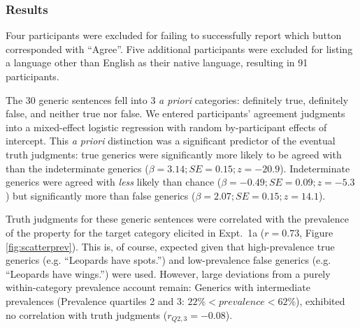 \documentclass[10pt,letterpaper]{article}
\begin{document}
\subsubsection{Results}

Four participants were excluded for failing to successfully report which button corresponded with ``Agree''. 
Five additional participants were excluded for listing a language other than English as their native language, resulting in 91 participants.


The 30 generic sentences fell into 3 \emph{a priori} categories: definitely true, definitely false, and neither true nor false. 
We entered participants' agreement judgments into a mixed-effect logistic regression with random by-participant effects of intercept. 
This \emph{a priori} distinction was a significant predictor of the eventual truth judgments: true generics were significantly more likely to be agreed with than the indeterminate generics ($\beta = 3.14; SE = 0.15; z = -20.9$).
Indeterminate generics were agreed with \emph{less} likely than chance ($\beta = -0.49; SE = 0.09; z = -5.3$) but significantly more than false generics ($\beta = 2.07; SE = 0.15; z = 14.1$).

Truth judgments for these generic sentences were correlated with the prevalence of the property for the target category elicited in Expt.~1a ($r = 0.73$, Figure \ref{fig:scatterprev}). This is, of course, expected given that high-prevalence true generics (e.g. ``Leopards have spots.'') and low-prevalence false generics (e.g. ``Leopards have wings.'') were used. 
However, large deviations from a purely within-category prevalence account remain: Generics with intermediate prevalences (Prevalence quartiles 2 and 3: $ 22\% < prevalence < 62\%$), exhibited no correlation with truth judgments ($r_{Q2,3} = -0.08$).
\end{document}
